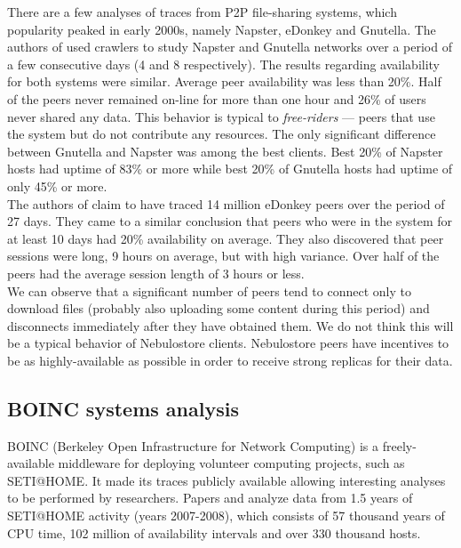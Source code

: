 \documentclass{pracamgren}
\begin{document}
There are a few analyses of traces from P2P file-sharing systems, which popularity peaked in early 2000s, namely Napster, eDonkey and Gnutella. The authors of \cite{napster} used crawlers to study Napster and Gnutella networks over a period of a few consecutive days (4 and 8 respectively). The results regarding availability for both systems were similar. Average peer availability was less than 20\%. Half of the peers never remained on-line for more than one hour and 26\% of users never shared any data. This behavior is typical to {\it free-riders} --- peers that use the system but do not contribute any resources. The only significant difference between Gnutella and Napster was among the best clients. Best 20\% of Napster hosts had uptime of 83\% or more while best 20\% of Gnutella hosts had uptime of only 45\% or more.\\

The authors of \cite{edonkey} claim to have traced 14 million eDonkey peers over the period of 27 days. They came to a similar conclusion that peers who were in the system for at least 10 days had 20\% availability on average. They also discovered that peer sessions were long, 9 hours on average, but with high variance. Over half of the peers had the average session length of 3 hours or less.\\

We can observe that a significant number of peers tend to connect only to download files (probably also uploading some content during this period) and disconnects immediately after they have obtained them. We do not think this will be a typical behavior of Nebulostore clients. Nebulostore peers have incentives to be as highly-available as possible in order to receive strong replicas for their data.\\

\subsection{BOINC systems analysis}

BOINC (Berkeley Open Infrastructure for Network Computing) is a freely-available middleware for deploying volunteer computing projects, such as SETI@HOME. It made its traces publicly available allowing interesting analyses to be performed by researchers. Papers \cite{availability} and \cite{seti} analyze data from 1.5 years of SETI@HOME activity (years 2007-2008), which consists of 57 thousand years of CPU time, 102 million of availability intervals and over 330 thousand hosts.\\
\end{document}
